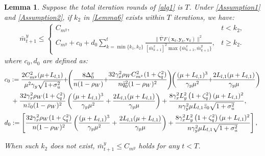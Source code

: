\documentclass{article}
\theoremstyle{plain}
\newtheorem{lemma}[lemma]{Lemma}
\theoremstyle{definition}
\theoremstyle{remark}
\begin{document}
\begin{lemma}\label{Lemma9} Suppose the total iteration rounds of \cref{alg1} is $T$. Under \cref{Assumption1} and \cref{Assumption2}, if $k_2$ in \cref{Lemma6} exists within $T$ iterations, we have:
\begin{align}
\bar{m}^y_{t+1} \leq 
\begin{cases} 
C_{m^y}, & t < k_2, \\
C_{m^y}+c_0+d_0 \sum_{k=\min\{k_1,k_2\}}^t \frac{\|\bar{\nabla} F(\mathbf{x}_k,\mathbf{y}_k,\mathbf{v}_k)\|^2}{[\bar{m}^x_{k+1}]^2\max \big\{\bar{m}^v_{k+1}, \bar{m}^y_{k+1}\big\}}, 
& t \geq k_2.
\end{cases}\label{eqnewc0d081}
\end{align}
where $c_0, d_0$ are defined as:
\begin{align}
&c_0:= \frac{ 2C_{m^y}^2(\mu \!+\! L_{l,1})}{\mu^2\gamma_y\sqrt{1\!+\!\sigma_u^2}}\! \!+\!\!\left(\frac{8\Delta_0^x}{n(1-\rho_W)}\!\!+\!\!\frac{32 \gamma_x^2 \rho_WC_{m^x}^2 (1 + \zeta_q^2)}{n\bar{q}_0^2(1 - \rho_W)^2} \right)\!\!\left(\frac{(\mu+L_{l,1})^3}{\gamma_y\mu^2}\!\!+\!\!\frac{2L_{l,1}(\mu+L_{l,1})}{\gamma_y\mu}\right)\notag\\
&\quad+ \frac{32 \gamma_x^2 \rho_W(1 + \zeta_q^2)}{n\bar{z}_0(1 - \rho_W)^2} \left(\frac{(\mu+L_{l,1})^3}{\gamma_y\mu^2}+\frac{2L_{l,1}(\mu+L_{l,1})}{\gamma_y\mu}\right)+\frac{8\gamma_x^2  L_y^2\left( 1 + \zeta_q^2 \right) (\mu + L_{l,1})^2}{n\gamma_y^2\mu L_{l,1}\bar{z}_0\sqrt{1+\sigma_u^2}},\notag\\
&d_0:= \left[\frac{32 \gamma_x^2 \rho_W(1 + \zeta_q^2)}{n(1 - \rho_W)^2} \left(\frac{(\mu+L_{l,1})^3}{\gamma_y\mu^2}+\frac{2L_{l,1}(\mu+L_{l,1})}{\gamma_y\mu}\right)+\frac{8\gamma_x^2  L_y^2\left( 1 + \zeta_q^2 \right) (\mu + L_{l,1})^2}{n\gamma_y^2\mu L_{l,1}\sqrt{1+\sigma_u^2}}\right],\label{eq84}
\end{align}

When such $k_2$ does not exist, $\bar{m}^y_{t+1} \leq C_{m^y}$ holds for any $t < T$.
\end{lemma}
\end{document}
